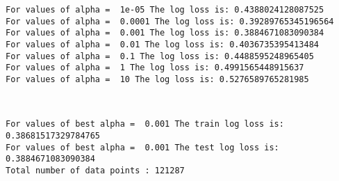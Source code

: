 \documentclass[11pt]{article}
\begin{document}
    \begin{Verbatim}[commandchars=\\\{\}]
For values of alpha =  1e-05 The log loss is: 0.4388024128087525
For values of alpha =  0.0001 The log loss is: 0.39289765345196564
For values of alpha =  0.001 The log loss is: 0.3884671083090384
For values of alpha =  0.01 The log loss is: 0.4036735395413484
For values of alpha =  0.1 The log loss is: 0.4488595248965405
For values of alpha =  1 The log loss is: 0.4991565448915637
For values of alpha =  10 The log loss is: 0.5276589765281985

    \end{Verbatim}

    \begin{center}
    \end{center}
    { \hspace*{\fill} \\}
    
    \begin{Verbatim}[commandchars=\\\{\}]
For values of best alpha =  0.001 The train log loss is: 0.38681517329784765
For values of best alpha =  0.001 The test log loss is: 0.3884671083090384
Total number of data points : 121287

    \end{Verbatim}

    \begin{center}
    \end{center}
    { \hspace*{\fill} \\}
    
\end{document}

